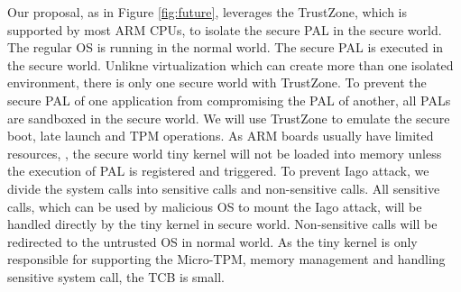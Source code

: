 Our proposal, as in Figure \ref{fig:future}, leverages the TrustZone, which is supported by most ARM CPUs, to
isolate the secure PAL in the secure world. The regular OS is running in the
normal world. The secure PAL is executed in the secure world. Unlikne
virtualization which can create more than one isolated environment, there is
only one secure world with TrustZone. To prevent the secure PAL of one
application from compromising the PAL of another, all PALs are sandboxed in the
secure world. We will use TrustZone to emulate the secure boot, late launch and
TPM operations. As ARM boards usually have limited resources, , the secure world
tiny kernel will not be loaded into memory unless the execution of PAL is
registered and triggered. To prevent Iago attack, we divide the system calls
into sensitive calls and non-sensitive calls. All sensitive calls, which can be
used by malicious OS to mount the Iago attack, will be handled directly by the
tiny kernel in secure world. Non-sensitive calls will be redirected to the
untrusted OS in normal world. As the tiny kernel is only responsible for
supporting the Micro-TPM, memory management and handling sensitive system call,
the TCB is small.  
